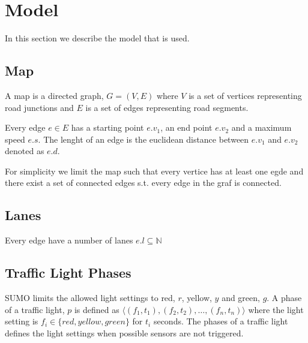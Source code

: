 \section{Model}
In this section we describe the model that is used.

\begin{comment}\\\\
\noindent\begin{tabular}{ll}
$\Sigma$ & alphabet\\
$\mathbb{R}$ & set of real numbers\\
$\mathbb{N}$ & set of natual numbers not including zero\\
$\mathbb{N}_0$ & set of natual numbers including zero
\end{tabular}
\end{comment}

\subsection{Map}
A map is a directed graph, $G = (V, E)$ where $V$ is a set of vertices representing road junctions and $E$ is a set of edges representing road segments.

Every edge $e\in E$ has a starting point $e.v_1$, an end point $e.v_2$ and a maximum speed $e.s$. The lenght of an edge is the euclidean distance between $e.v_1$ and $e.v_2$ denoted as $e.d$.

For simplicity we limit the map such that every vertice has at least one egde
and there exist a set of connected edges s.t. every edge in the graf is connected.%

\subsection{Lanes}
Every edge have a number of lanes $e.l \subseteq \mathbb{N} $


\subsection{Traffic Light Phases}
SUMO limits the allowed light settings to red, $r$, yellow, $y$ and green, $g$.
A phase of a traffic light, $p$ is defined as $\langle(f_1, t_1),(f_2, t_2),\dots, (f_n, t_n) \rangle$ where the light setting is $f_i\in \{red, yellow, green\}$ for $t_i$ seconds.
The phases of a traffic light defines the light settings when possible sensors are not triggered.

